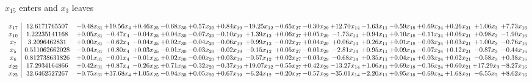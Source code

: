 \documentclass[9pt]{article}
\begin{document}
 $ x_{15} $ enters and $ x_{3} $ leaves 

 \[\begin{array}{c| c c@{\hskip 2pt} c@{\hskip 2pt} c@{\hskip 2pt} c@{\hskip 2pt} c@{\hskip 2pt} c@{\hskip 2pt} c@{\hskip 2pt} c@{\hskip 2pt} c@{\hskip 2pt} c@{\hskip 2pt} c@{\hskip 2pt} c@{\hskip 2pt} c@{\hskip 2pt} c@{\hskip 2pt} c@{\hskip 2pt} c@{\hskip 2pt} }
 x_{17}   &  12.6171765507 & -0.48 x_{31} & + 19.56 x_{4} & +  0.46 x_{25} & -0.68 x_{30} & +  0.57 x_{20} & +  0.84 x_{19} & -19.25 x_{12} & -0.65 x_{27} & -0.30 x_{29} & + 12.70 x_{14} & -1.63 x_{11} & -0.59 x_{18} & +  0.69 x_{24} & +  0.26 x_{21} & +  1.06 x_{3} & +  7.73 x_{16}\\
 x_{10}   &  1.22235141168 & +  0.05 x_{31} & -0.47 x_{4} & -0.04 x_{25} & +  0.04 x_{30} & -0.07 x_{20} & -0.10 x_{19} & +  1.39 x_{12} & +  0.06 x_{27} & +  0.05 x_{29} & -1.73 x_{14} & +  0.94 x_{11} & +  0.10 x_{18} & -0.11 x_{24} & +  0.06 x_{21} & +  0.98 x_{3} & -1.90 x_{16}\\
 x_{7}   &  3.2096462831 & +  0.00 x_{31} & -0.62 x_{4} & -0.04 x_{25} & +  0.02 x_{30} & -0.04 x_{20} & -0.06 x_{19} & +  0.99 x_{12} & -0.02 x_{27} & +  0.04 x_{29} & +  0.06 x_{14} & +  0.26 x_{11} & +  0.01 x_{18} & -0.03 x_{24} & +  0.03 x_{21} & +  1.00 x_{3} & -0.76 x_{16}\\
 x_{5}   &  0.511062662028 & -0.04 x_{31} & +  0.80 x_{4} & +  0.03 x_{25} & -0.01 x_{30} & -0.03 x_{20} & -0.02 x_{19} & -0.15 x_{12} & +  0.05 x_{27} & -0.01 x_{29} & -2.81 x_{14} & +  0.95 x_{11} & +  0.09 x_{18} & -0.07 x_{24} & +  0.12 x_{21} & -0.87 x_{3} & -0.44 x_{16}\\
 x_{6}   &  0.812738631826 & +  0.01 x_{31} & -0.01 x_{4} & -0.01 x_{25} & +  0.02 x_{30} & -0.00 x_{20} & +  0.03 x_{19} & -0.57 x_{12} & +  0.02 x_{27} & -0.03 x_{29} & -0.68 x_{14} & +  0.35 x_{11} & +  0.04 x_{18} & +  0.03 x_{24} & +  0.02 x_{21} & -0.58 x_{3} & +  0.38 x_{16}\\
 x_{22}   &  17.2934164866 & +  0.42 x_{31} & +  0.87 x_{4} & -0.26 x_{25} & +  0.71 x_{30} & -0.32 x_{20} & -0.37 x_{19} & + 19.07 x_{12} & -0.55 x_{27} & +  0.42 x_{29} & -13.27 x_{14} & +  1.06 x_{11} & +  0.69 x_{18} & -0.36 x_{24} & +  0.60 x_{21} & + 17.29 x_{3} & -8.27 x_{16}\\
 x_{23}   &  32.6462527267 & -0.75 x_{31} & + 37.68 x_{4} & +  1.05 x_{25} & -0.94 x_{30} & +  0.05 x_{20} & +  0.67 x_{19} & -6.24 x_{12} & -0.20 x_{27} & -0.57 x_{29} & -35.01 x_{14} & -2.20 x_{11} & +  0.95 x_{18} & -0.69 x_{24} & +  1.68 x_{21} & -6.55 x_{3} & +  8.62 x_{16}\\

\end{array}\]
\end{document}
